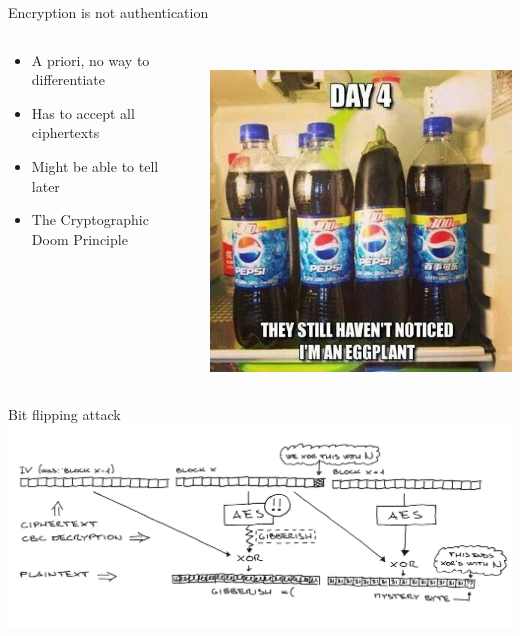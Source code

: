 \documentclass[10pt, compress]{beamer}
\begin{document}
\begin{frame}{Encryption is not authentication}
\begin{columns}
    \begin{column}{0.5\textwidth}
      \begin{itemize}
        \item A priori, no way to differentiate
        \item Has to accept all ciphertexts
        \item Might be able to tell later
        \item The Cryptographic Doom Principle

      \end{itemize}
    \end{column}
    \begin{column}{0.5\textwidth}
      \\
      \includegraphics[width=\textwidth]{images/a8169e9a993e5cc8d3a06dd3e532791a--eggplants-so-funny.jpg} \\
    \end{column}
  \end{columns}
\end{frame}


\begin{frame}{Bit flipping attack}
  \includegraphics[width=\textwidth]{images/S22C-6e16050401360-1-1.jpg} \\
\end{frame}
\end{document}
